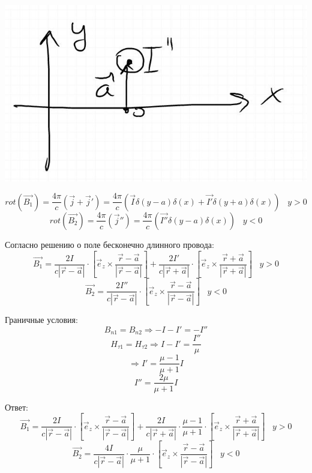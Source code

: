 \documentclass[12pt]{article}
\begin{document}
\begin{large}
\par
\includegraphics[width=1\textwidth]{photo_2.jpg}
\par
\[
    rot\left( \overrightarrow{B_1} \right) = \frac{4\pi}{c}(\vec{j} + \vec{j}' ) = \frac{4\pi}{c}(\overrightarrow{I} \delta(y-a)\delta(x) + \overrightarrow{I'} \delta(y+a) \delta(x)) \,\,\,\,\, y > 0
\]
\[
    rot\left( \overrightarrow{B_2} \right) = \frac{4\pi}{c}(\vec{j}'' ) = \frac{4\pi}{c}(\overrightarrow{I''} \delta(y-a)\delta(x)) \,\,\,\,\, y < 0
\]
\par Согласно решению о поле бесконечно длинного провода:
\[
    \overrightarrow{B_1} = \frac{2I}{c|\vec{r} - \vec{a}|} \cdot \left[ \vec{e}_z \times \frac{\vec{r} - \vec{a}}{|\vec{r} - \vec{a}|}  \right] + \frac{2I'}{c|\vec{r} + \vec{a}|} \cdot  \left[  \vec{e}_z \times \frac{\vec{r} + \vec{a}}{|\vec{r} + \vec{a}|}  \right]   \,\,\,\,\, y > 0
\]
\[
    \overrightarrow{B_2} = \frac{2I''}{c|\vec{r} - \vec{a}|} \cdot \left[ \vec{e}_z \times \frac{\vec{r} - \vec{a}}{|\vec{r} - \vec{a}|}  \right]   \,\,\,\,\, y < 0
\]
\par Граничные условия:
\[
    B_{n1} = B_{n2} \Rightarrow -I - I' = -I''
\]
\[
    H_{\tau 1} = H_{\tau 2} \Rightarrow I - I' = \frac{I''}{\mu}
\]
\[
    \Rightarrow I' = \frac{\mu - 1}{\mu + 1} I
\]
\[
    I'' = \frac{2 \mu}{\mu + 1} I
\]
\par Ответ:
\[
    \overrightarrow{B_1} = \frac{2I}{c|\vec{r} - \vec{a}|} \cdot \left[ \vec{e}_z \times \frac{\vec{r} - \vec{a}}{|\vec{r} - \vec{a}|}  \right] + \frac{2I}{c|\vec{r} + \vec{a}|} \cdot \frac{\mu - 1}{\mu + 1} \cdot  \left[  \vec{e}_z \times \frac{\vec{r} + \vec{a}}{|\vec{r} + \vec{a}|}  \right]   \,\,\,\,\, y > 0
\]
\[
    \overrightarrow{B_2} = \frac{4I}{c|\vec{r} - \vec{a}|} \cdot \frac{\mu}{\mu + 1}  \cdot \left[ \vec{e}_z \times \frac{\vec{r} - \vec{a}}{|\vec{r} - \vec{a}|}  \right]   \,\,\,\,\, y < 0
\]
\end{large}
\end{document}
